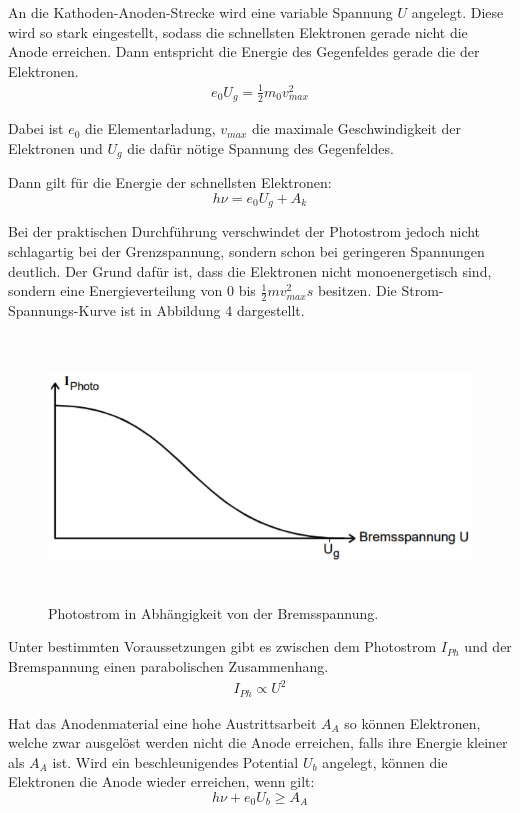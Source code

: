 An die Kathoden-Anoden-Strecke wird eine variable Spannung $U$ angelegt. Diese wird so stark eingestellt, sodass die
schnellsten Elektronen gerade nicht die Anode erreichen. Dann entspricht die Energie des Gegenfeldes gerade die der Elektronen.
\begin{align}
  e_0 U_g = \frac{1}{2} m_0 v_{max}^2
\end{align}

Dabei ist $e_0$ die Elementarladung, $v_{max}$ die maximale Geschwindigkeit der Elektronen und $U_g$ die dafür nötige
Spannung des Gegenfeldes.

Dann gilt für die Energie der schnellsten Elektronen:
\begin{equation}
  h \nu = e_0 U_g  + A_k
\end{equation}

Bei der praktischen Durchführung verschwindet der Photostrom jedoch nicht schlagartig bei der Grenzspannung, sondern schon
bei geringeren Spannungen deutlich. Der Grund dafür ist, dass die Elektronen nicht monoenergetisch sind, sondern eine
Energieverteilung von $0$ bis $\frac{1}{2} m v_{max}^2s$ besitzen.
Die Strom-Spannungs-Kurve ist in Abbildung 4 dargestellt.

\begin{figure}[H]
  \centering
  \includegraphics[height=7cm]{fermi.PNG}
  \caption{Photostrom in Abhängigkeit von der Bremsspannung. \cite{sample}}
  \label{fig:kathode}
\end{figure}

Unter bestimmten Voraussetzungen gibt es zwischen dem Photostrom $I_{Ph}$ und der Bremspannung einen parabolischen Zusammenhang.
\begin{align*}
  I_{Ph} \propto U^2
\end{align*}


Hat das Anodenmaterial eine hohe Austrittsarbeit $A_A$ so können Elektronen, welche zwar ausgelöst werden nicht die
Anode erreichen, falls ihre Energie kleiner als $A_A$ ist. Wird ein beschleunigendes Potential $U_b$ angelegt, können
die Elektronen die Anode wieder erreichen, wenn gilt:
\begin{equation}
  h \nu + e_0 U_b \geq A_A
\end{equation}
